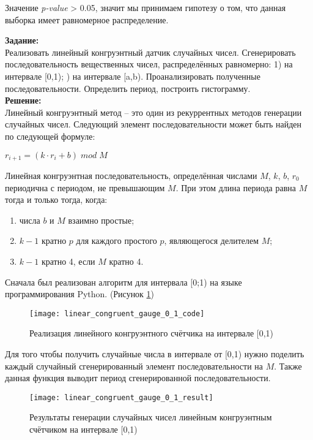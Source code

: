 Значение \textit{p-value} > 0.05, значит мы принимаем гипотезу о том, что данная выборка имеет равномерное распределение.

\textbf{Задание:}\\
Реализовать линейный конгруэнтный датчик случайных чисел. Сгенерировать последовательность вещественных чисел, распределённых равномерно: 1) на интервале [0,1); ) на интервале [a,b). Проанализировать полученные последовательности. Определить период, построить гистограмму.\\

\textbf{Решение:}\\
Линейный конгруэнтный метод -- это один из рекуррентных методов генерации случайных чисел. Следующий элемент последовательности может быть найден по следующей формуле:
\begin{center}
	$ r_{i+1} = (k \cdot r_i + b) \; mod \; M$
\end{center}

Линейная конгруэнтная последовательность, определённая числами $M$, $k$, $b$, $r_0$ периодична с периодом, не превышающим $M$. При этом длина периода равна $M$ тогда и только тогда, когда:
\begin{enumerate}[topsep=0pt,itemsep=-1ex,partopsep=1ex,parsep=1ex]
	\item числа $b$ и $M$ взаимно простые;
	\item $k-1$ кратно $p$ для каждого простого $p$, являющегося делителем $M$;
	\item $k-1$ кратно 4, если $M$ кратно 4.
\end{enumerate}
Сначала был реализован алгоритм для интервала [0;1) на языке программирования Python. (Рисунок \ref{fig:linear_congruent_gauge_0_1_code})
\begin{figure}[h]
	\centering \texttt{[image: linear\_congruent\_gauge\_0\_1\_code]}
	\caption{Реализация линейного конгруэнтного счётчика на интервале [0,1)}
	\label{fig:linear_congruent_gauge_0_1_code}
\end{figure}

\newpage
Для того чтобы получить случайные числа в интервале от [0,1) нужно поделить каждый случайный сгенерированный элемент последовательности на $M$. Также данная функция выводит период сгенерированной последовательности.
\begin{figure}[h]
	\centering \texttt{[image: linear\_congruent\_gauge\_0\_1\_result]}
	\caption{Результаты генерации случайных чисел линейным конгруэнтным счётчиком на интервале [0,1)}
	\label{fig:linear_congruent_gauge_0_1_result}
\end{figure}


